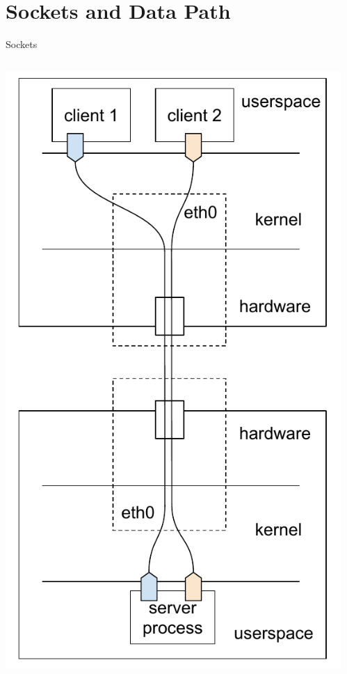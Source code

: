 \section{Sockets and Data Path}

\begin{frame}[fragile]{Sockets}
	\begin{columns}
			\includegraphics[width=1.4\textwidth]{slides/networking-socket/socket.pdf}
		\begin{itemize}

\end{itemize}
\end{columns}
\end{frame}
